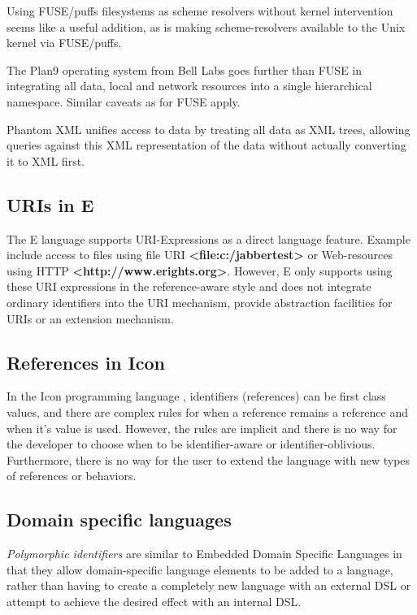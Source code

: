 \documentclass[preprint,authoryear]{acm_proc_article-sp}
\begin{document}
Using FUSE/puffs filesystems as scheme resolvers without kernel intervention seems
like a useful addition, as is making scheme-resolvers available to the Unix kernel
via FUSE/puffs.

The Plan9\cite{plan9names}\cite{plan9network} operating system from Bell Labs goes further than FUSE in integrating
all data, local and network resources into a single hierarchical namespace.  Similar
caveats as for FUSE apply.

Phantom XML\cite{phantomxml} unifies access to data by treating all data as
XML trees, allowing queries against this XML representation of the data without
actually converting it to XML first.  




\subsection{URIs in E}

The E language\cite{MillerRobustComposition}  supports URI-Expressions as a
direct language feature.  Example include access to files
using file URI  {\bf <file:c:/jabbertest>} or Web-resources using HTTP {\bf <http://www.erights.org>}.  However,
E only supports using these URI expressions in the reference-aware style and does not integrate 
ordinary identifiers into the URI mechanism, provide abstraction facilities 
for URIs or an extension mechanism. 


\subsection{References in Icon}

In the Icon programming language \cite{IconRef} , identifiers (references) can be first class values,
and there are complex rules for when a reference remains a reference and when
it's value is used.  However, the rules are implicit and there is no way for the 
developer to choose when to be identifier-aware or identifier-oblivious.  Furthermore,
there is no way for the user to extend the language with new types of references 
or behaviors.



\subsection{Domain specific languages}

\emph{Polymorphic identifiers} are similar to Embedded Domain Specific Languages\cite{edsl}
in that they allow domain-specific language elements to be added to a language, rather
than having to create a completely new language with an external DSL or attempt to 
achieve the desired effect with an internal DSL\cite{fowlerdsl}.  
\end{document}
